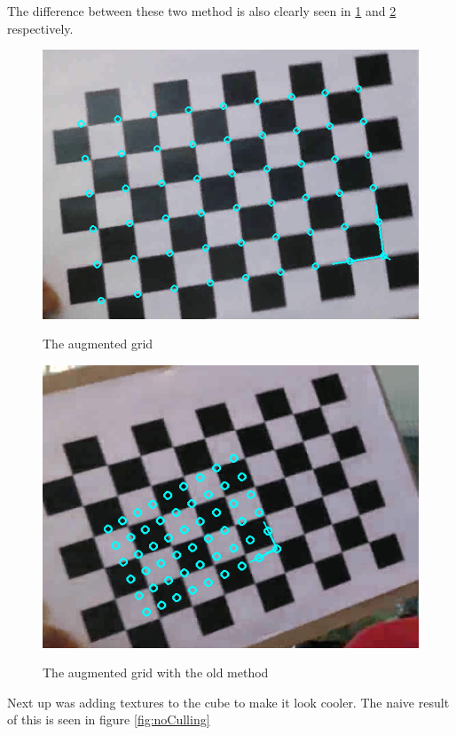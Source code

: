 The difference between these two method is also clearly seen in \ref{fig:grid}
and \ref{fig:gridOld} respectively.  

\begin{figure}[[!htbp]
    \includegraphics{pics/grid.png}
    \label{fig:grid}
    \caption{The augmented grid}
\end{figure}

\begin{figure}[!htbp]
    \includegraphics{pics/gridOld.png}
    \label{fig:gridOld}
    \caption{The augmented grid with the old method}
\end{figure}

Next up was adding textures to the cube to make it look cooler. The naive result
of this is seen in figure \ref{fig:noCulling}

